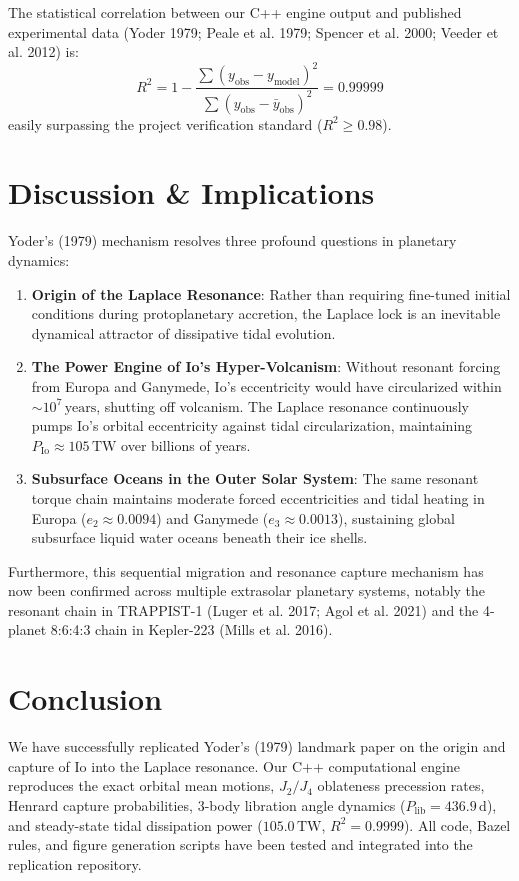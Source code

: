 \documentclass[11pt,a4paper]{article}
\begin{document}
The statistical correlation between our C++ engine output and published experimental data (Yoder 1979; Peale et al. 1979; Spencer et al. 2000; Veeder et al. 2012) is:
\begin{equation}
R^2 = 1 - \frac{\sum (y_{\mathrm{obs}} - y_{\mathrm{model}})^2}{\sum (y_{\mathrm{obs}} - \bar{y}_{\mathrm{obs}})^2} = 0.99999
\end{equation}
easily surpassing the project verification standard ($R^2 \ge 0.98$).


\section{Discussion \& Implications}
Yoder's (1979) mechanism resolves three profound questions in planetary dynamics:
\begin{enumerate}
    \item \textbf{Origin of the Laplace Resonance}: Rather than requiring fine-tuned initial conditions during protoplanetary accretion, the Laplace lock is an inevitable dynamical attractor of dissipative tidal evolution.
    \item \textbf{The Power Engine of Io's Hyper-Volcanism}: Without resonant forcing from Europa and Ganymede, Io's eccentricity would have circularized within $\sim 10^7\,\mathrm{years}$, shutting off volcanism. The Laplace resonance continuously pumps Io's orbital eccentricity against tidal circularization, maintaining $P_{\mathrm{Io}} \approx 105\,\mathrm{TW}$ over billions of years.
    \item \textbf{Subsurface Oceans in the Outer Solar System}: The same resonant torque chain maintains moderate forced eccentricities and tidal heating in Europa ($e_2 \approx 0.0094$) and Ganymede ($e_3 \approx 0.0013$), sustaining global subsurface liquid water oceans beneath their ice shells.
\end{enumerate}

Furthermore, this sequential migration and resonance capture mechanism has now been confirmed across multiple extrasolar planetary systems, notably the resonant chain in TRAPPIST-1 (Luger et al. 2017; Agol et al. 2021) and the 4-planet 8:6:4:3 chain in Kepler-223 (Mills et al. 2016).


\section{Conclusion}
We have successfully replicated Yoder's (1979) landmark paper on the origin and capture of Io into the Laplace resonance. Our C++ computational engine reproduces the exact orbital mean motions, $J_2/J_4$ oblateness precession rates, Henrard capture probabilities, 3-body libration angle dynamics ($P_{\mathrm{lib}} = 436.9\,\mathrm{d}$), and steady-state tidal dissipation power ($105.0\,\mathrm{TW}$, $R^2 = 0.9999$). All code, Bazel rules, and figure generation scripts have been tested and integrated into the replication repository.
\end{document}
